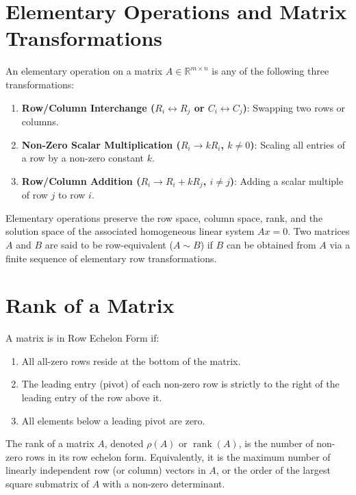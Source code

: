 \section{Elementary Operations and Matrix Transformations}
\begin{definition}
An elementary operation on a matrix $A \in \mathbb{R}^{m \times n}$ is any of the following three transformations:
\begin{enumerate}
    \item \textbf{Row/Column Interchange ($R_i \leftrightarrow R_j$ or $C_i \leftrightarrow C_j$)}: Swapping two rows or columns.
    \item \textbf{Non-Zero Scalar Multiplication ($R_i \to k R_i$, $k \neq 0$)}: Scaling all entries of a row by a non-zero constant $k$.
    \item \textbf{Row/Column Addition ($R_i \to R_i + k R_j$, $i \neq j$)}: Adding a scalar multiple of row $j$ to row $i$.
\end{enumerate}
\end{definition}

\begin{theorem}
Elementary operations preserve the row space, column space, rank, and the solution space of the associated homogeneous linear system $Ax = 0$. Two matrices $A$ and $B$ are said to be row-equivalent ($A \sim B$) if $B$ can be obtained from $A$ via a finite sequence of elementary row transformations.
\end{theorem}

\section{Rank of a Matrix}
\begin{definition}
A matrix is in Row Echelon Form if:
\begin{enumerate}
    \item All all-zero rows reside at the bottom of the matrix.
    \item The leading entry (pivot) of each non-zero row is strictly to the right of the leading entry of the row above it.
    \item All elements below a leading pivot are zero.
\end{enumerate}
\end{definition}

\begin{definition}
The rank of a matrix $A$, denoted $\rho(A)$ or $\operatorname{rank}(A)$, is the number of non-zero rows in its row echelon form. Equivalently, it is the maximum number of linearly independent row (or column) vectors in $A$, or the order of the largest square submatrix of $A$ with a non-zero determinant.
\end{definition}

